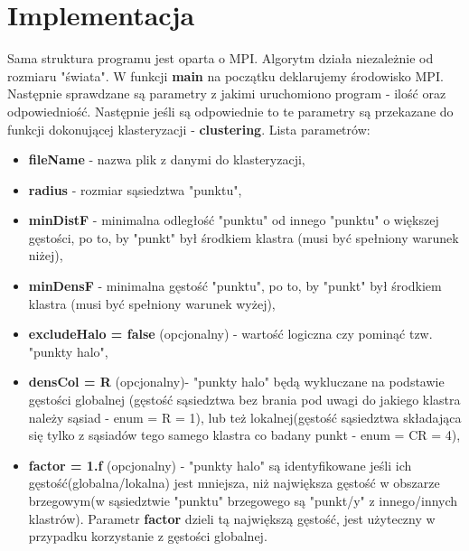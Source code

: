 \documentclass[a4paper,10pt,table]{article}
\begin{document}
\section{Implementacja}
Sama struktura programu jest oparta o MPI. Algorytm działa niezależnie od rozmiaru "świata". W funkcji \textbf{main} na początku deklarujemy środowisko MPI. Następnie sprawdzane są parametry z jakimi uruchomiono program - ilość oraz odpowiedniość. Następnie jeśli są odpowiednie to te parametry są przekazane do funkcji dokonującej klasteryzacji - \textbf{clustering}.
Lista parametrów:
\begin{itemize}
\item  \textbf{fileName} - nazwa plik z danymi do klasteryzacji, 
\item \textbf{radius} - rozmiar sąsiedztwa "punktu", 
\item \textbf{minDistF} - minimalna odległość "punktu" od innego "punktu" o większej gęstości, po to, by "punkt" był środkiem klastra (musi być spełniony warunek niżej), 
\item \textbf{minDensF} - minimalna gęstość "punktu", po to, by "punkt" był środkiem klastra (musi być spełniony warunek wyżej),
\item \textbf{excludeHalo = false} (opcjonalny) - wartość logiczna czy pominąć tzw. "punkty halo", 
\item \textbf{densCol = R} (opcjonalny)- "punkty halo" będą wykluczane na podstawie gęstości globalnej (gęstość sąsiedztwa bez brania pod uwagi do jakiego klastra należy sąsiad - enum = R = 1), lub też lokalnej(gęstość sąsiedztwa składająca się tylko z sąsiadów tego samego klastra co badany punkt - enum = CR = 4),
\item \textbf{factor = 1.f} (opcjonalny) - "punkty halo" są identyfikowane jeśli ich gęstość(globalna/lokalna) jest mniejsza, niż największa gęstość w obszarze brzegowym(w sąsiedztwie "punktu" brzegowego są "punkt/y" z innego/innych klastrów). Parametr \textbf{factor} dzieli tą największą gęstość, jest użyteczny w przypadku korzystanie z gęstości globalnej. 
\end{itemize}
\end{document}
